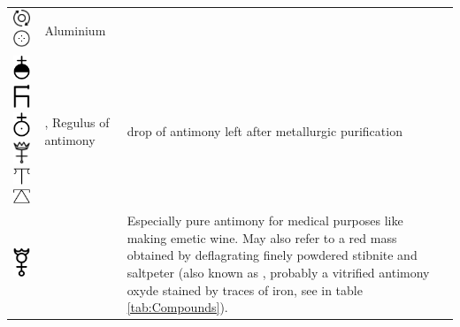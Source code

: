 \documentclass[british,final,landscape]{scrartcl}
\begin{document}
\begin{refsection}
 \tablelasttail{\bottomrule}
 \begin{supertabular}{p{0.3\textwidth}p{0.34\textwidth}p{0.34\textwidth}}
  \includegraphics[width=5mm]{Elements/Aluminium} \includegraphics[width=5mm]{Elements/Aluminium2} & Aluminium & \\
  \includegraphics[width=5mm]{Elements/AntimonyRegulus} \includegraphics[width=5mm]{Elements/AntimonyRegulus2} \includegraphics[width=5mm]{Elements/AntimonyRegulus3} \includegraphics[width=5mm]{Elements/AntimonyRegulus4} \includegraphics[width=5mm]{Elements/AntimonyRegulus5} \includegraphics[width=5mm]{Elements/AntimonyRegulus6} & , Regulus of antimony & drop of antimony left after metallurgic purification \\
  \includegraphics[width=5mm]{Elements/AntimonyRegulusMedicinalis} &  & Especially pure antimony for medical purposes like making emetic wine. May also refer to a red mass obtained by deflagrating finely powdered stibnite and saltpeter (also known as , probably a vitrified antimony oxyde stained by traces of iron, see  in table \ref{tab:Compounds}).  \\

\end{supertabular}
\end{refsection}
\end{document}
